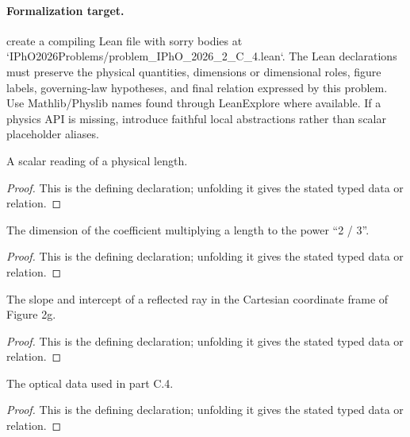 \paragraph{Formalization target.}
create a compiling Lean file with sorry bodies at `IPhO2026Problems/problem\_IPhO\_2026\_2\_C\_4.lean`. The Lean declarations must preserve the physical quantities, dimensions or dimensional roles, figure labels, governing-law hypotheses, and final relation expressed by this problem.
Use Mathlib/Physlib names found through LeanExplore where available. If a physics API is missing, introduce faithful local abstractions rather than scalar placeholder aliases.

\begin{definition}[LengthReading]
  \label{decl:physics:IPhO_2026_2_C_4:LengthReading}
  A scalar reading of a physical length.
\end{definition}
\begin{proof}
  This is the defining declaration; unfolding it gives the stated typed data or relation.
\end{proof}

\begin{definition}[CubeRootLengthReading]
  \label{decl:physics:IPhO_2026_2_C_4:CubeRootLengthReading}
  The dimension of the coefficient multiplying a length to the power “2 / 3”.
\end{definition}
\begin{proof}
  This is the defining declaration; unfolding it gives the stated typed data or relation.
\end{proof}

\begin{definition}[ReflectedLineReadout]
  \label{decl:physics:IPhO_2026_2_C_4:ReflectedLineReadout}
  The slope and intercept of a reflected ray in the Cartesian coordinate frame of Figure 2g.
\end{definition}
\begin{proof}
  This is the defining declaration; unfolding it gives the stated typed data or relation.
\end{proof}

\begin{definition}
  \label{decl:physics:IPhO_2026_2_C_4:Figure2gOpticalSystem}
  The optical data used in part C.4.
\end{definition}
\begin{proof}
  This is the defining declaration; unfolding it gives the stated typed data or relation.
\end{proof}


